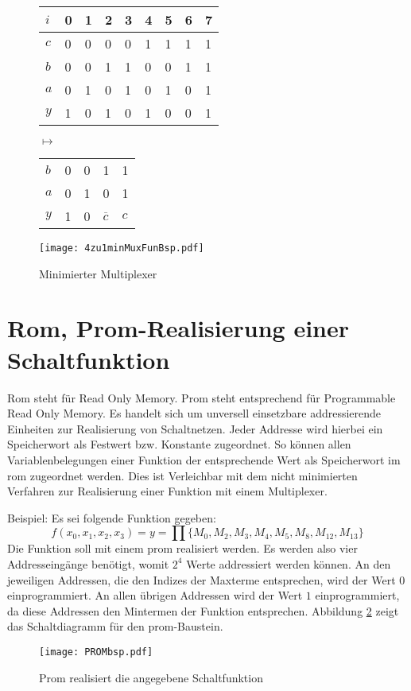 \begin{figure}[htp]
	\centering
	\begin{tabular}{*{9}{l}}    
	$i$ & 0 & 1 & 2 & 3 & 4 & 5 & 6 & 7 \\ \hline
	$c$ & 0 & 0 & 0 & 0 & 1 & 1 & 1 & 1 \\
	$b$ & 0 & 0 & 1 & 1 & 0 & 0 & 1 & 1 \\
	$a$ & 0 & 1 & 0 & 1 & 0 & 1 & 0 & 1 \\ \hline
	$y$ & 1 & 0 & 1 & 0 & 1 & 0 & 0 & 1 \\
	\end{tabular}
	$\mapsto$
	\begin{tabular}{*{5}{l}}    
	$b$ & 0 & 0 & 1              & 1 \\
	$a$ & 0 & 1 & 0              & 1 \\ \hline
	$y$ & 1 & 0 & $\overline{c}$ & $c$ \\
	\end{tabular}
	
	\vspace{1cm}
	
	\texttt{[image: 4zu1minMuxFunBsp.pdf]}
	\caption{Minimierter Multiplexer}
	\label{minMuxFunBsp}
\end{figure} 


\section{{\sc Rom, Prom}-Realisierung einer Schaltfunktion}
{\sc Rom} steht für Read Only Memory. {\sc Prom} steht entsprechend für Programmable Read Only Memory. Es handelt sich um unversell einsetzbare addressierende Einheiten zur Realisierung von Schaltnetzen. Jeder Addresse wird hierbei ein Speicherwort als Festwert bzw. Konstante zugeordnet. So können allen Variablenbelegungen einer Funktion der entsprechende Wert als Speicherwort im {\sc rom} zugeordnet werden. Dies ist Verleichbar mit dem nicht minimierten Verfahren zur Realisierung einer Funktion mit einem Multiplexer.

Beispiel: Es sei folgende Funktion gegeben:
$$f(x_0, x_1, x_2, x_3) = y = \prod \{M_0, M_2, M_3, M_4, M_5, M_8, M_{12}, M_{13}\}$$ %
Die Funktion soll mit einem {\sc prom} realisiert werden. Es werden also vier Addresseingänge benötigt, womit $2^4$ Werte addressiert werden können. An den jeweiligen Addressen, die den Indizes der Maxterme entsprechen, wird der Wert $0$ einprogrammiert. An allen übrigen Addressen wird der Wert $1$ einprogrammiert, da diese Addressen den Mintermen der Funktion entsprechen. Abbildung \ref{PROMbeispiel} zeigt das Schaltdiagramm für den {\sc prom}-Baustein.
\begin{figure}[htp]
	\centering
	\texttt{[image: PROMbsp.pdf]}
	\caption{{\sc Prom} realisiert die angegebene Schaltfunktion}
	\label{PROMbeispiel}
\end{figure}

